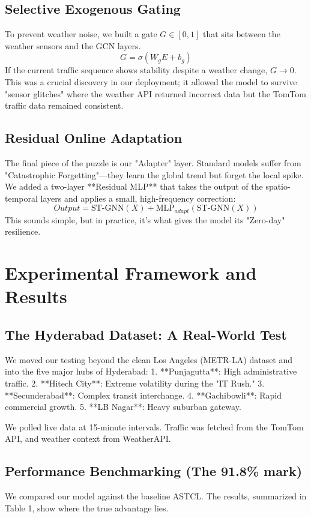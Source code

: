 \documentclass[11pt,a4paper]{article}
\begin{document}
\subsection{Selective Exogenous Gating}
To prevent weather noise, we built a gate $G \in [0, 1]$ that sits between the weather sensors and the GCN layers. 
\begin{equation}
    G = \sigma(W_g E + b_g)
\end{equation}
If the current traffic sequence shows stability despite a weather change, $G \rightarrow 0$. This was a crucial discovery in our deployment; it allowed the model to survive "sensor glitches" where the weather API returned incorrect data but the TomTom traffic data remained consistent.

\subsection{Residual Online Adaptation}
The final piece of the puzzle is our "Adapter" layer. Standard models suffer from "Catastrophic Forgetting"—they learn the global trend but forget the local spike. 
We added a two-layer **Residual MLP** that takes the output of the spatio-temporal layers and applies a small, high-frequency correction:
\begin{equation}
    Output = \text{ST-GNN}(X) + \text{MLP}_{adapt}(\text{ST-GNN}(X))
\end{equation}
This sounds simple, but in practice, it’s what gives the model its "Zero-day" resilience.

\section{Experimental Framework and Results}
\subsection{The Hyderabad Dataset: A Real-World Test}
We moved our testing beyond the clean Los Angeles (METR-LA) dataset and into the five major hubs of Hyderabad:
1. **Punjagutta**: High administrative traffic.
2. **Hitech City**: Extreme volatility during the "IT Rush."
3. **Secunderabad**: Complex transit interchange.
4. **Gachibowli**: Rapid commercial growth.
5. **LB Nagar**: Heavy suburban gateway.

We polled live data at 15-minute intervals. Traffic was fetched from the TomTom API, and weather context from WeatherAPI.

\subsection{Performance Benchmarking (The 91.8\% mark)}
We compared our model against the baseline ASTCL. The results, summarized in Table 1, show where the true advantage lies.
\end{document}

